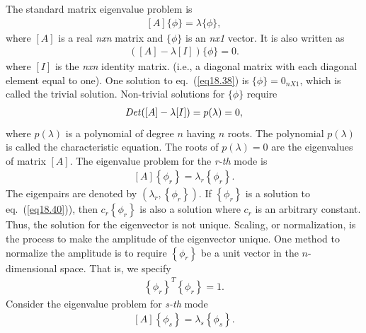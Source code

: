 \documentclass{AeroStructure-ERJohnson}
\begin{document}
The standard matrix eigenvalue problem is
\begin{align}\label{eq18.38}
[A]\{\phi\}=\lambda\{\phi\},
\end{align}
where $[A]$ is a real \textit{nxn} matrix and $\{\phi\}$ is an \textit{nx1 }vector. It is also written as
\begin{align}\label{18.4e}
([A]-\lambda[I])\{\phi\}=0.\tag{e}
\end{align}
where $[I]$ is the \textit{nxn} identity matrix. (i.e., a diagonal matrix with each diagonal element equal to one). One solution to eq.~(\ref{eq18.38}) is $\{\phi\}=0_{n X 1}$, which is called the trivial solution. Non-trivial solutions for $\{\phi\}$ require
\begin{align}\label{eq18.39}
\operatorname{\it Det}([A]-\lambda[I])=p(\lambda)=0,
\end{align}
where $p(\lambda)$ is a polynomial of degree $n$ having $n$ roots. The polynomial $p(\lambda)$ is called the characteristic equation. The roots of $p(\lambda)=0$ are the eigenvalues of matrix $[A]$. The eigenvalue problem for the \textit{r-th} mode is
\begin{align}\label{eq18.40}
[A]\left\{\phi_{r}\right\}=\lambda_{r}\left\{\phi_{r}\right\}.
\end{align}
The eigenpairs are denoted by $\left(\lambda_{r},\left\{\phi_{r}\right\}\right)$. If $\left\{\phi_{r}\right\}$ is a solution to eq.~(\ref{eq18.40})), then $c_{r}\left\{\phi_{r}\right\}$ is also a solution where $c_{r}$ is an arbitrary constant. Thus, the solution for the eigenvector is not unique. Scaling, or normalization, is the process to make the amplitude of the eigenvector unique. One method to normalize the amplitude is to require $\left\{\phi_{r}\right\}$ be a unit vector in the $n$-dimensional space. That is, we specify
\begin{align}\label{eq18.41}
\left\{\phi_{r}\right\}^{T}\left\{\phi_{r}\right\}=1.
\end{align}
Consider the eigenvalue problem for \textit{s-th} mode
\begin{align}\label{eq18.42}
[A]\left\{\phi_{s}\right\}=\lambda_{s}\left\{\phi_{s}\right\}.
\end{align}

\vspace*{-1pc}\pagebreak
\end{document}
